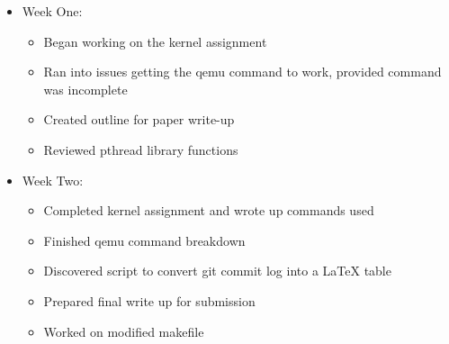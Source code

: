 \documentclass[letterpaper,10pt]{article}
\begin{document}
\begin{itemize}
\begin{itemize}
      \item Week One:
        \begin{itemize}
          \item Began working on the kernel assignment
            \item Ran into issues getting the qemu command to work, provided command was incomplete
            \item Created outline for paper write-up
            \item Reviewed pthread library functions
        \end{itemize}
        \item Week Two:
        \begin{itemize}
          \item Completed kernel assignment and wrote up commands used
            \item Finished qemu command breakdown
            \item Discovered script to convert git commit log into a \LaTeX{} table
            \item Prepared final write up for submission
            \item Worked on modified makefile
        \end{itemize}
    \end{itemize}
\end{itemize}
\end{document}
